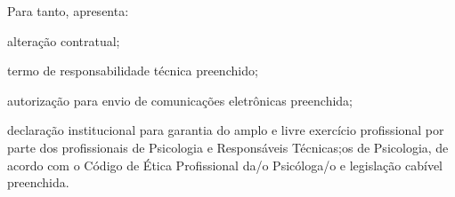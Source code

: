 \documentclass[openright, oneside, a4paper, article, brazil]{abntex2}
\begin{document}
\begin{framed}
\begin{minipage}[t]{\linewidth-\boxlarg}
        Para tanto, apresenta:
        \vspace{\baselineskip}\small

        \begin{minipage}[t]{\boxlarg}
            \hfill{\null}
        \end{minipage}%
        \begin{minipage}[t]{\linewidth-\boxlarg}
                      \begin{minipage}[t]{\boxlarg}
                          \raisebox{-2.2pt}{\fbox{\CheckBox[name=alteracao_apenas_registrada,bordercolor=black]{\null}}}
                      \end{minipage}%
                      \begin{minipage}[t]{\linewidth-\boxlarg}
                          alteração contratual;
                      \end{minipage}

                      \begin{minipage}[t]{\boxlarg}
                          \raisebox{-2.2pt}{\fbox{\CheckBox[name=alteracao_apenas_registrada_termo,bordercolor=black]{\null}}}
                      \end{minipage}%
                      \begin{minipage}[t]{\linewidth-\boxlarg}
                          termo de responsabilidade técnica preenchido;
                      \end{minipage}

                      \begin{minipage}[t]{\boxlarg}
                        \raisebox{-2.2pt}{\fbox{\CheckBox[name=autorizacao_envio,bordercolor=black]{\null}}}
                    \end{minipage}%
                    \begin{minipage}[t]{\linewidth-\boxlarg}
                        autorização para envio de comunicações eletrônicas preenchida;
                    \end{minipage}

                    \begin{minipage}[t]{\boxlarg}
                        \raisebox{-15pt}{\fbox{\CheckBox[name=declaracao_institucional,bordercolor=black]{\null}}}
                    \end{minipage}%
                    \begin{minipage}[t]{\linewidth-\boxlarg}
                        declaração institucional para garantia do amplo e livre exercício profissional por parte dos profissionais de Psicologia e Responsáveis Técnicas;os de Psicologia, de acordo com o Código de Ética Profissional da/o Psicóloga/o e legislação cabível preenchida.
                    \end{minipage}
                      \vspace{0.5\baselineskip}

        \end{minipage}
    \end{minipage}
\end{framed}
\normalsize
\end{document}

